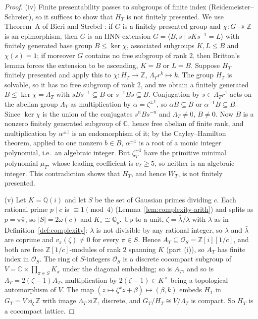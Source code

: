 \documentclass[11pt]{article}
\theoremstyle{plain}
\theoremstyle{definition}
\theoremstyle{remark}
\newcommand{\Z}{\mathbb{Z}}
\newcommand{\Q}{\mathbb{Q}}
\newcommand{\C}{\mathbb{C}}
\begin{document}
\begin{proof}
(iv) Finite presentability passes to subgroups of finite index
(Reidemeister--Schreier), so it suffices to show that $H_T$ is not finitely
presented. We use Theorem~A of Bieri and Strebel \cite{BieriStrebel1978}: if $G$
is a finitely presented group and $\chi\colon G\twoheadrightarrow\Z$ is an
epimorphism, then $G$ is an HNN-extension $G=\langle B,s\mid sKs^{-1}=L\rangle$
with finitely generated base group $B\le\ker\chi$, associated subgroups
$K,L\le B$ and $\chi(s)=1$; if moreover $G$ contains no free subgroup of rank
$2$, then Britton's lemma forces the extension to be ascending, $K=B$ or $L=B$.
Suppose $H_T$ finitely presented and apply this to
$\chi\colon H_T\to\Z$, $\Lambda_T r^k\mapsto k$. The group $H_T$ is solvable,
so it has no free subgroup of rank $2$, and we obtain a finitely generated
$B\le\ker\chi=\Lambda_T$ with $sBs^{-1}\subseteq B$ or $s^{-1}Bs\subseteq B$.
Conjugation by $s\in\Lambda_Tr^{1}$ acts on the abelian group $\Lambda_T$ as
multiplication by $\alpha=\zeta^{\pm1}$, so $\alpha B\subseteq B$ or
$\alpha^{-1}B\subseteq B$. Since $\ker\chi$ is the union of the conjugates
$s^nBs^{-n}$ and $\Lambda_T\ne0$, $B\ne0$. Now $B$ is a nonzero finitely
generated subgroup of $\C$, hence free abelian of finite rank, and
multiplication by $\alpha^{\pm1}$ is an endomorphism of it; by the
Cayley--Hamilton theorem, applied to one nonzero $b\in B$, $\alpha^{\pm1}$ is a
root of a monic integer polynomial, i.e.\ an algebraic integer. But
$\zeta_T^{\pm1}$ have the primitive minimal polynomial $\mu_T$, whose leading
coefficient is $c_T\ge5$, so neither is an algebraic integer. This
contradiction shows that $H_T$, and hence $W_T$, is not finitely presented.

(v) Let $K=\Q(i)$ and let $S$ be the set of Gaussian primes dividing $c$. Each
rational prime $p\mid c$ is $\equiv1\pmod4$
(Lemma~\ref{lem:complexity-arith}) and splits as $p=\pi\bar\pi$, so $|S|=2\omega(c)$
and $K_\pi\cong\Q_p$. Up to a unit, $\zeta=\bar\lambda/\lambda$ with $\lambda$ as in
Definition~\ref{def:complexity}; $\lambda$ is not divisible by any rational
integer, so $\lambda$ and $\bar\lambda$ are coprime and $v_\pi(\zeta)\ne0$ for every
$\pi\in S$. Hence $A_T\subseteq\mathcal O_S=\Z[i][1/c]$, and both are free
$\Z[1/c]$-modules of rank $2$ spanning $K$ (part (i)), so $A_T$ has finite
index in $\mathcal O_S$. The ring of $S$-integers $\mathcal O_S$ is a discrete
cocompact subgroup of $V=\C\times\prod_{\pi\in S}K_\pi$ under the diagonal
embedding; so is $A_T$, and so is $\Lambda_T=2(\zeta-1)A_T$, multiplication by
$2(\zeta-1)\in K^\times$ being a topological automorphism of $V$. The map
$(z\mapsto\zeta^kz+\beta)\mapsto(\beta,k)$ embeds $H_T$ in $G_T=V\rtimes_\zeta\Z$
with image $\Lambda_T\rtimes\Z$, discrete, and $G_T/H_T\cong V/\Lambda_T$ is
compact. So $H_T$ is a cocompact lattice.


\end{proof}
\end{document}
